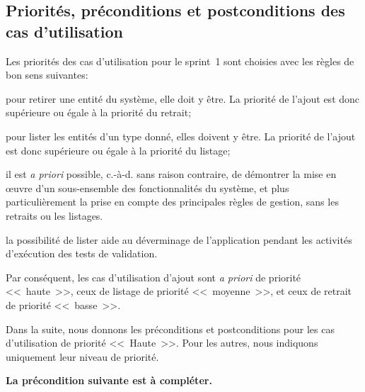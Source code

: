 \documentclass[11pt,article]{article}
\newcommand{\haute}{Haute}
\begin{document}
\newpage

\subsection{Priorités, préconditions et postconditions des cas d'utilisation}

Les priorités des cas d'utilisation pour le sprint~1 sont choisies
avec les règles de bon sens suivantes:
\begin{compactitem}
\item pour retirer une entité du système, elle doit y être. La
priorité de l'ajout est donc supérieure ou égale à la priorité du
retrait;
\item pour lister les entités d'un type donné, elles doivent y être. La
priorité de l'ajout est donc supérieure ou égale à la priorité du
listage;
\item il est \textit{a priori} possible, c.-à-d. sans raison
contraire, de démontrer la mise en œuvre d'un sous-ensemble des
fonctionnalités du système, et plus particulièrement la prise en
compte des principales règles de gestion, sans les retraits ou les
listages.
\item la possibilité de lister aide au déverminage de l'application
pendant les activités d'exécution des tests de validation.
\end{compactitem}
Par conséquent, les cas d'utilisation d'ajout sont \textit{a priori}
de priorité <<~haute~>>, ceux de listage de priorité <<~moyenne~>>, et
ceux de retrait de priorité <<~basse~>>.

\bigskip

Dans la suite, nous donnons les préconditions et postconditions pour
les cas d'utilisation de priorité <<~\haute~>>. Pour les autres, nous
indiquons uniquement leur niveau de priorité.

\bigskip

{\color{red}\textbf{La précondition suivante est à compléter.}}
\end{document}
